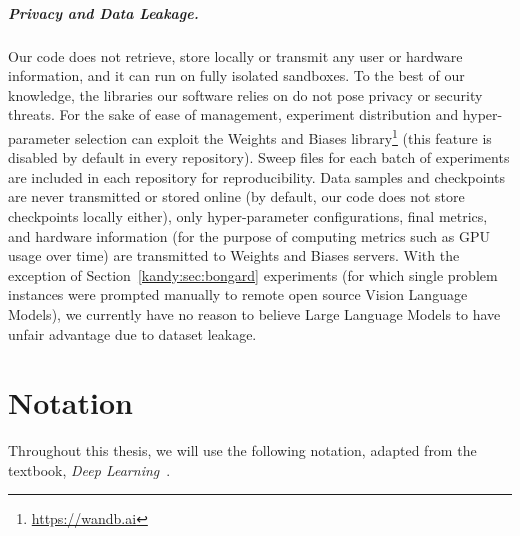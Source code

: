 \documentclass[a4paper,twoside,openright]{book}
\theoremstyle{plain}
\theoremstyle{definition}
\begin{document}
\paragraph{Privacy and Data Leakage.}
Our code does not retrieve, store locally or transmit any user or hardware information, and it can run on fully isolated sandboxes. To the best of our knowledge, the libraries our software relies on do not pose privacy or security threats.
%
For the sake of ease of management, experiment distribution and hyper-parameter selection can exploit the Weights and Biases library\footnote{\url{https://wandb.ai}} (this feature is disabled by default in every repository). Sweep files for each batch of experiments are included in each repository for reproducibility. Data samples and checkpoints are never transmitted or stored online (by default, our code does not store checkpoints locally either), only hyper-parameter configurations, final metrics, and hardware information (for the purpose of computing metrics such as GPU usage over time) are transmitted to Weights and Biases servers. With the exception of Section~\ref{kandy:sec:bongard} experiments (for which single problem instances were prompted manually to remote open source Vision Language Models), we currently have no reason to believe Large Language Models to have unfair advantage due to dataset leakage. 

\chapter{Notation}
Throughout this thesis, we will use the following notation, adapted from the textbook, \textit{Deep Learning}~\cite{goodfellow2016deep}. 
\end{document}
